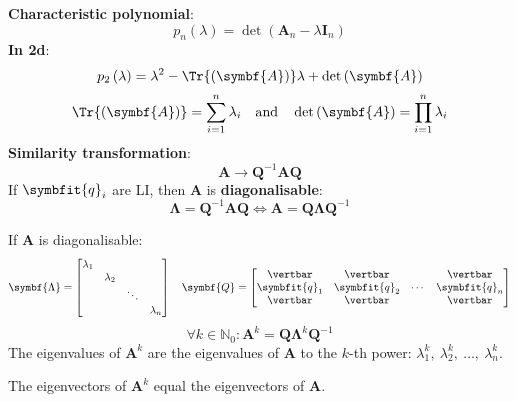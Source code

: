 \documentclass{article}
\begin{document}
\begin{minipage}[t]{126.1962963mm}
\begin{multicols*}{2}
        \textbf{Characteristic polynomial}:
        \begin{equation*}
            p_n\left(\lambda\right) = \det{\left( \symbf{A}_n - \lambda\symbf{I}_n \right)}
        \end{equation*}
        \textbf{In 2d}:
        \begin{equation*}
            p_2\left(\lambda\right) = \lambda^2-\Tr{\left( \symbf{A} \right)}\lambda + \det{\left( \symbf{A} \right)}
        \end{equation*}
        \begin{equation*}
            \Tr{\left( \symbf{A} \right)} = \sum_{i=1}^n \lambda_i \quad \text{and} \quad
            \det{\left( \symbf{A} \right)} = \prod_{i=1}^n \lambda_i
        \end{equation*}
        \textbf{Similarity transformation}:
        \begin{equation*}
            \symbf{A}\rightarrow \symbf{Q}^{-1}\symbf{A}\symbf{Q}
        \end{equation*}
        If \(\symbfit{q}_i\) are LI, then \(\symbf{A}\) is
        \textbf{diagonalisable}:
        \begin{equation*}
            \symbf{\Lambda}=\symbf{Q}^{-1}\symbf{A}\symbf{Q} \iff \symbf{A}=\symbf{Q}\symbf{\Lambda}\symbf{Q}^{-1}
        \end{equation*}
    \end{multicols*}
    If \(\symbf{A}\) is diagonalisable:
    \begin{equation*}
        \symbf{\Lambda}=
        \begin{bmatrix}
            \lambda_1                         \\
             & \lambda_2                      \\
             &           & \ddots             \\
             &           &        & \lambda_n
        \end{bmatrix} \quad
        \symbf{Q}=
        \begin{bmatrix}
            \vertbar      & \vertbar      &        & \vertbar      \\
            \symbfit{q}_1 & \symbfit{q}_2 & \cdots & \symbfit{q}_n \\
            \vertbar      & \vertbar      &        & \vertbar
        \end{bmatrix}
    \end{equation*}
    \begin{equation*}
        \forall k \in \mathbb{N}_0:\symbf{A}^k = \symbf{Q} \symbf{\Lambda}^k \symbf{Q}^{-1}
    \end{equation*}
    The eigenvalues of \(\symbf{A}^k\) are the eigenvalues of \(\symbf{A}\)
    to the \(k\)-th power: \(\lambda_1^k,\: \lambda_2^k,\: \dots,\: \lambda_n^k\).

    The eigenvectors of \(\symbf{A}^k\) equal the eigenvectors of \(\symbf{A}\).
\end{minipage}
\end{document}
